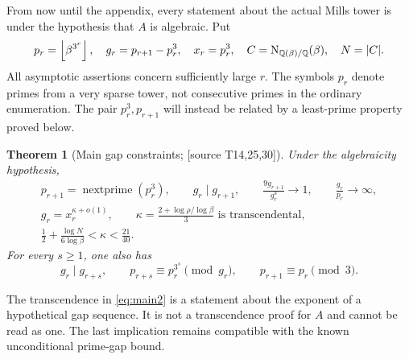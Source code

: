 \documentclass[11pt,a4paper]{article}
\newtheorem{theorem}{Theorem}[section]
\theoremstyle{definition}\newtheorem{definition}[theorem]{Definition}
\theoremstyle{remark}\newtheorem{remark}[theorem]{Remark}
\newcommand{\Q}{\mathbb Q}\newcommand{\Z}{\mathbb Z}\newcommand{\N}{\mathbb N}\newcommand{\R}{\mathbb R}\newcommand{\C}{\mathbb C}
\newcommand{\floor}[1]{\left\lfloor #1\right\rfloor}\newcommand{\ceil}[1]{\left\lceil #1\right\rceil}
\newcommand{\sourceT}[1]{\textup{[source T#1]}}
\begin{document}
From now until the appendix, every statement about the actual Mills tower is under the hypothesis that $A$ is algebraic. Put
\[
 p_r=\floor{\beta^{3^r}},\quad g_r=p_{r+1}-p_r^3,\quad x_r=p_r^3,
 \quad C=\Norm_{\Q(\beta)/\Q}(\beta),\quad N=|C|.
\]
All asymptotic assertions concern sufficiently large $r$. The symbols $p_r$ denote primes from a very sparse tower, not consecutive primes in the ordinary enumeration. The pair $p_r^3,p_{r+1}$ will instead be related by a least-prime property proved below.

\begin{theorem}[Main gap constraints; \sourceT{14,25,30}]\label{thm:main}
Under the algebraicity hypothesis,
\begin{gather}
 p_{r+1}=\operatorname{nextprime}(p_r^3),\qquad
 g_r\mid g_{r+1},\qquad \frac{9g_{r+1}}{g_r^3}\longrightarrow1,
 \qquad \frac{g_r}{p_r}\longrightarrow\infty,\label{eq:main1}\\
 g_r=x_r^{\kappa+o(1)},\qquad
 \kappa=\frac{2+\log\rho/\log\beta}{3}\text{ is transcendental},\label{eq:main2}\\
 \frac12+\frac{\log N}{6\log\beta}<\kappa<\frac{21}{40}.\label{eq:main3}
\end{gather}
For every $s\ge1$, one also has
\[
 g_r\mid g_{r+s},\qquad p_{r+s}\equiv p_r^{3^s}\pmod{g_r},
 \qquad p_{r+1}\equiv p_r\pmod3.
\]
\end{theorem}
The transcendence in \eqref{eq:main2} is a statement about the exponent of a hypothetical gap sequence. It is not a transcendence proof for $A$ and cannot be read as one. The last implication remains compatible with the known unconditional prime-gap bound.
\end{document}
